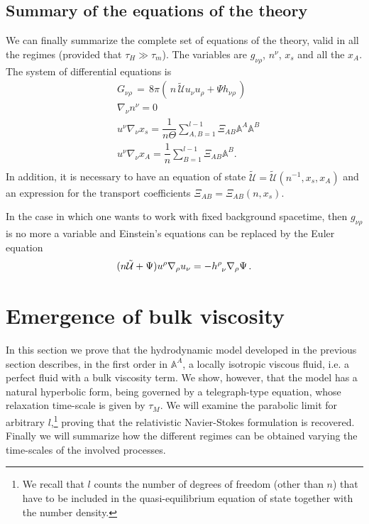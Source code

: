 \documentclass[useAMS,usenatbib,prd,twocolumn,nofootinbib]{revtex4-1}
\begin{document}
\subsection{Summary of the equations of the theory}

We can finally summarize the complete set of equations of the theory, valid in all the regimes (provided that $\tau_H \gg \tau_m$). The variables are $g_{\nu \rho}$, $n^\nu$, $x_s$ and all the $x_A$. The system of differential equations is
\begin{equation}
\begin{split}
& {G_{\nu \rho}}\, = \, 8 \pi (\,  n\, \tilde{\mathcal{U}} u_\nu u_\rho + \Psi h_{\nu \rho} \, )\\
& \nabla_\nu n^\nu =0 \\
&  u^\nu \nabla_\nu x_s =\dfrac{1}{n\Theta} \sum_{A,B=1}^{l-1} \Xi_{AB} \mathbb{A}^A \mathbb{A}^B \\
& u^\nu \nabla_\nu x_A = \dfrac{1}{n} \sum_{B=1}^{l-1} \Xi_{AB} \mathbb{A}^B. \\
\end{split}
\end{equation}
In addition, it is necessary to have an equation of state $\tilde{\mathcal{U}}=\tilde{\mathcal{U}}(n^{-1},x_s,x_A)$ and an expression for the transport coefficients $\Xi_{AB}=\Xi_{AB}(n,x_s)$.

In the case in which one wants to work with fixed background spacetime, then $g_{\nu \rho}$ is no more a variable and Einstein's equations can be replaced by the Euler equation
\begin{equation}
(n\tilde{\mathcal{U}}+\Psi)u^\rho \nabla_\rho u_\nu = - h\indices{^\rho _\nu} \nabla_\rho \Psi \, .
\end{equation}







\section{Emergence of bulk viscosity}\label{eobv!!!}

In this section we prove that the hydrodynamic model developed in the previous section describes, in the first order in $\mathbb{A}^A$, a locally isotropic viscous fluid, i.e. a perfect fluid with a bulk viscosity term.
We show, however, that the model has a natural hyperbolic form, being governed by a telegraph-type equation, whose relaxation time-scale is given by $\tau_M$. 
We will examine the parabolic limit for arbitrary $l$,\footnote{
    We recall that $l$ counts the number of degrees of freedom (other than $n$) that have to be included in the quasi-equilibrium equation of state together with the number density.} 
proving that the relativistic Navier-Stokes formulation is recovered. 
Finally we will summarize how the different regimes can be obtained varying the time-scales of the involved processes.
\end{document}
